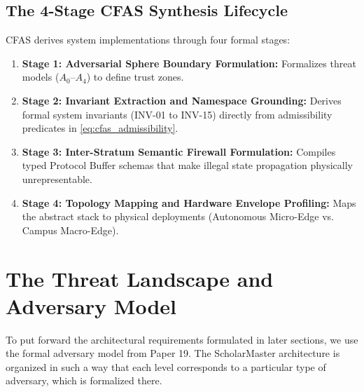 \documentclass[conference]{IEEEtran}
\begin{document}
\subsection{The 4-Stage CFAS Synthesis Lifecycle}
CFAS derives system implementations through four formal stages:
\begin{enumerate}
    \item \textbf{Stage 1: Adversarial Sphere Boundary Formulation:} Formalizes threat models ($A_0$--$A_4$) to define trust zones.
    \item \textbf{Stage 2: Invariant Extraction and Namespace Grounding:} Derives formal system invariants (INV-01 to INV-15) directly from admissibility predicates in \eqref{eq:cfas_admissibility}.
    \item \textbf{Stage 3: Inter-Stratum Semantic Firewall Formulation:} Compiles typed Protocol Buffer schemas that make illegal state propagation physically unrepresentable.
    \item \textbf{Stage 4: Topology Mapping and Hardware Envelope Profiling:} Maps the abstract stack to physical deployments (Autonomous Micro-Edge vs. Campus Macro-Edge).
\end{enumerate}

\section{The Threat Landscape and Adversary Model}
To put forward the architectural requirements formulated in later sections, we use the formal adversary model from Paper 19. The ScholarMaster architecture is organized in such a way that each level corresponds to a particular type of adversary, which is formalized there.
\end{document}
